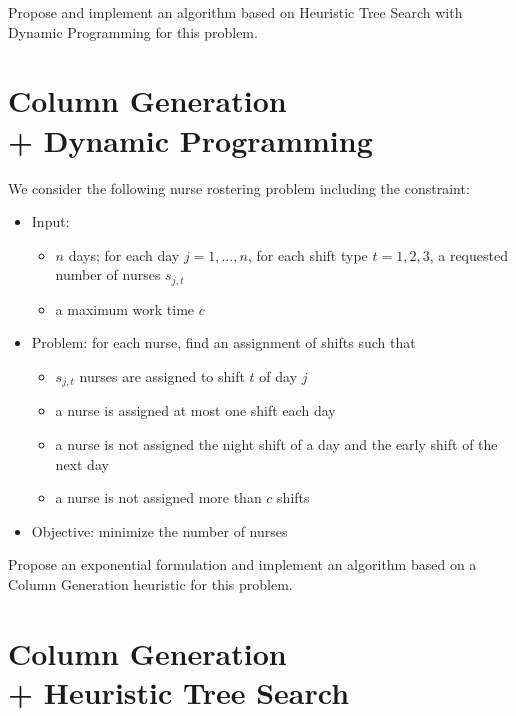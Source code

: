 \documentclass[a4paper,twocolumn]{article}
\begin{document}
Propose and implement an algorithm based on Heuristic Tree Search with Dynamic Programming for this problem.

\section{Column Generation \\ + Dynamic Programming}

We consider the following nurse rostering problem including the constraint:
\begin{itemize}
  \item Input:
    \begin{itemize}
      \item $n$ days; for each day $j = 1, \dots, n$, for each shift type $t = 1, 2, 3$, a requested number of nurses $s_{j, t}$
      \item a maximum work time $c$
    \end{itemize}
  \item Problem: for each nurse, find an assignment of shifts such that
    \begin{itemize}
      \item $s_{j, t}$ nurses are assigned to shift $t$ of day $j$
      \item a nurse is assigned at most one shift each day
      \item a nurse is not assigned the night shift of a day and the early shift of the next day
      \item a nurse is not assigned more than $c$ shifts
    \end{itemize}
  \item Objective: minimize the number of nurses
\end{itemize}

Propose an exponential formulation and implement an algorithm based on a Column Generation heuristic for this problem.

\section{Column Generation \\ + Heuristic Tree Search}
\end{document}
